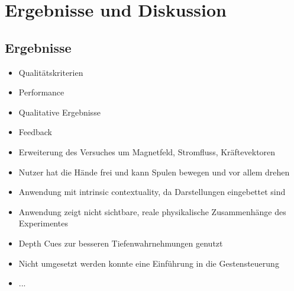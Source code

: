 \section{Ergebnisse und Diskussion}
\label{sec-6}

\subsection{Ergebnisse}

\begin{itemize}
	\item Qualitätskriterien
	\item Performance
	\item Qualitative Ergebnisse
	\item Feedback
\end{itemize}

\begin{itemize}
	\item Erweiterung des Versuches um Magnetfeld, Stromfluss, Kräftevektoren
	\item Nutzer hat die Hände frei und kann Spulen bewegen und vor allem drehen
	\item Anwendung mit intrinsic contextuality, da Darstellungen eingebettet sind
	\item Anwendung zeigt nicht sichtbare, reale physikalische Zusammenhänge des Experimentes
	\item Depth Cues zur besseren Tiefenwahrnehmungen genutzt
	\item Nicht umgesetzt werden konnte eine Einführung in die Gestensteuerung
	\item ...
\end{itemize}

